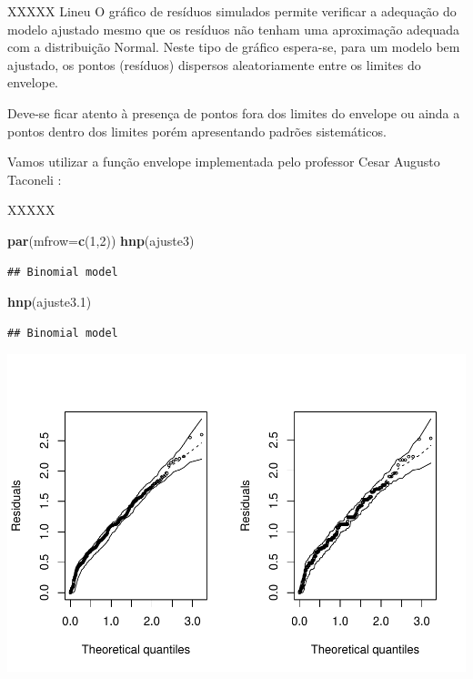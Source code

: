 \documentclass[]{article}
\newenvironment{Shaded}{\begin{snugshade}}{\end{snugshade}}
\newcommand{\KeywordTok}[1]{\textcolor[rgb]{0.13,0.29,0.53}{\textbf{{#1}}}}
\newcommand{\DataTypeTok}[1]{\textcolor[rgb]{0.13,0.29,0.53}{{#1}}}
\newcommand{\DecValTok}[1]{\textcolor[rgb]{0.00,0.00,0.81}{{#1}}}
\newcommand{\FloatTok}[1]{\textcolor[rgb]{0.00,0.00,0.81}{{#1}}}
\newcommand{\NormalTok}[1]{{#1}}
\begin{document}
XXXXX Lineu O gráfico de resíduos simulados permite verificar a
adequação do modelo ajustado mesmo que os resíduos não tenham uma
aproximação adequada com a distribuição Normal. Neste tipo de gráfico
espera-se, para um modelo bem ajustado, os pontos (resíduos) dispersos
aleatoriamente entre os limites do envelope.

Deve-se ficar atento à presença de pontos fora dos limites do envelope
ou ainda a pontos dentro dos limites porém apresentando padrões
sistemáticos.

Vamos utilizar a função envelope implementada pelo professor Cesar
Augusto Taconeli :

XXXXX

\begin{Shaded}
\begin{Highlighting}[]
\KeywordTok{par}\NormalTok{(}\DataTypeTok{mfrow=}\KeywordTok{c}\NormalTok{(}\DecValTok{1}\NormalTok{,}\DecValTok{2}\NormalTok{))}
\KeywordTok{hnp}\NormalTok{(ajuste3)}
\end{Highlighting}
\end{Shaded}

\begin{verbatim}
## Binomial model
\end{verbatim}

\begin{Shaded}
\begin{Highlighting}[]
\KeywordTok{hnp}\NormalTok{(ajuste3}\FloatTok{.1}\NormalTok{)}
\end{Highlighting}
\end{Shaded}

\begin{verbatim}
## Binomial model
\end{verbatim}

\includegraphics{Dados_Binários1_files/figure-latex/unnamed-chunk-19-1.pdf}
\end{document}

